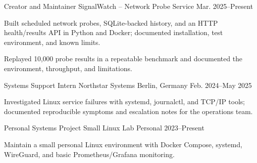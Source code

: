 
\begin{cventries}
  \cventry
    {Creator and Maintainer}
    {SignalWatch -- Network Probe Service}
    {}
    {Mar. 2025--Present}
    {
      \begin{cvitems}
        \item {Built scheduled network probes, SQLite-backed history, and an HTTP health/results API in Python and Docker; documented installation, test environment, and known limits.}
        \item {Replayed 10,000 probe results in a repeatable benchmark and documented the environment, throughput, and limitations.}
      \end{cvitems}
    }
\end{cventries}


\begin{cventries}
  \cventry
    {Systems Support Intern}
    {Northstar Systems}
    {Berlin, Germany}
    {Feb. 2024--May 2025}
    {
      \begin{cvitems}
        \item {Investigated Linux service failures with systemd, journalctl, and TCP/IP tools; documented reproducible symptoms and escalation notes for the operations team.}
      \end{cvitems}
    }

  \cventry
    {Personal Systems Project}
    {Small Linux Lab}
    {Personal}
    {2023--Present}
    {
      \begin{cvitems}
        \item {Maintain a small personal Linux environment with Docker Compose, systemd, WireGuard, and basic Prometheus/Grafana monitoring.}
      \end{cvitems}
    }
\end{cventries}
